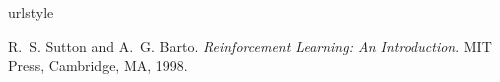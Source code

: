 \documentclass[a4paper]{article}
\begin{document}
\begin{thebibliography}{1}
\providecommand{\natexlab}[1]{#1}
\providecommand{\url}[1]{\texttt{#1}}
\expandafter\ifx\csname urlstyle\endcsname\relax
  \providecommand{\doi}[1]{doi: #1}\else
  \providecommand{\doi}{doi: \begingroup \urlstyle{rm}\Url}\fi

R.~S. Sutton and A.~G. Barto.
\newblock \emph{Reinforcement Learning: {A}n Introduction}.
\newblock MIT Press, Cambridge, MA, 1998.

\end{thebibliography}

\end{document}

